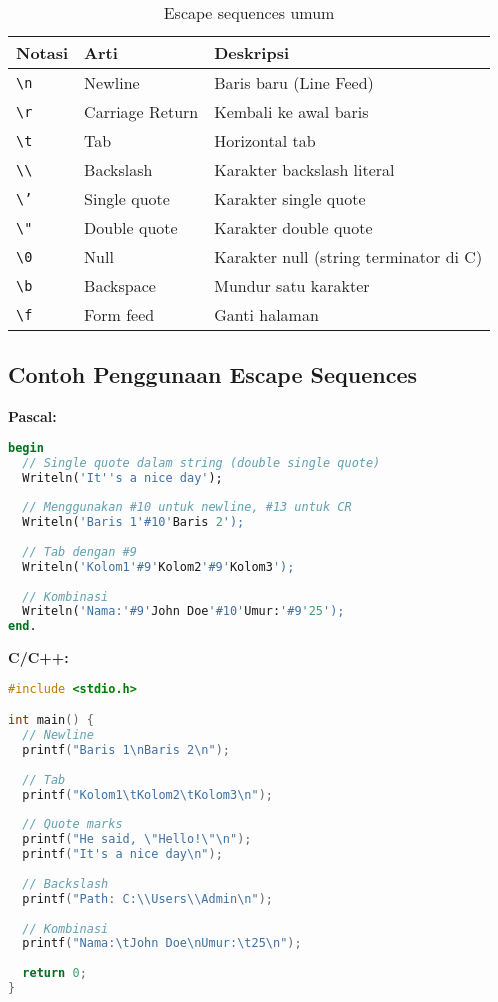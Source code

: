 \documentclass[../main.tex]{subfiles}
\begin{document}
\begin{table}[H]
  \centering
  \caption{Escape sequences umum}
  \begin{tabular}{@{}lll@{}}
    \toprule
    Notasi & Arti & Deskripsi \\
    \midrule
    \texttt{\textbackslash n} & Newline & Baris baru (Line Feed) \\
    \texttt{\textbackslash r} & Carriage Return & Kembali ke awal baris \\
    \texttt{\textbackslash t} & Tab & Horizontal tab \\
    \texttt{\textbackslash\textbackslash} & Backslash & Karakter backslash literal \\
    \texttt{\textbackslash'} & Single quote & Karakter single quote \\
    \texttt{\textbackslash"} & Double quote & Karakter double quote \\
    \texttt{\textbackslash 0} & Null & Karakter null (string terminator di C) \\
    \texttt{\textbackslash b} & Backspace & Mundur satu karakter \\
    \texttt{\textbackslash f} & Form feed & Ganti halaman \\
    \bottomrule
  \end{tabular}
\end{table}

\subsection{Contoh Penggunaan Escape Sequences}

\textbf{Pascal:}
\begin{lstlisting}[language=Pascal, caption={Escape sequences di Pascal}]
begin
  // Single quote dalam string (double single quote)
  Writeln('It''s a nice day');
  
  // Menggunakan #10 untuk newline, #13 untuk CR
  Writeln('Baris 1'#10'Baris 2');
  
  // Tab dengan #9
  Writeln('Kolom1'#9'Kolom2'#9'Kolom3');
  
  // Kombinasi
  Writeln('Nama:'#9'John Doe'#10'Umur:'#9'25');
end.
\end{lstlisting}

\textbf{C/C++:}
\begin{lstlisting}[language=C, caption={Escape sequences di C/C++}]
#include <stdio.h>

int main() {
  // Newline
  printf("Baris 1\nBaris 2\n");
  
  // Tab
  printf("Kolom1\tKolom2\tKolom3\n");
  
  // Quote marks
  printf("He said, \"Hello!\"\n");
  printf("It's a nice day\n");
  
  // Backslash
  printf("Path: C:\\Users\\Admin\n");
  
  // Kombinasi
  printf("Nama:\tJohn Doe\nUmur:\t25\n");
  
  return 0;
}
\end{lstlisting}
\end{document}
